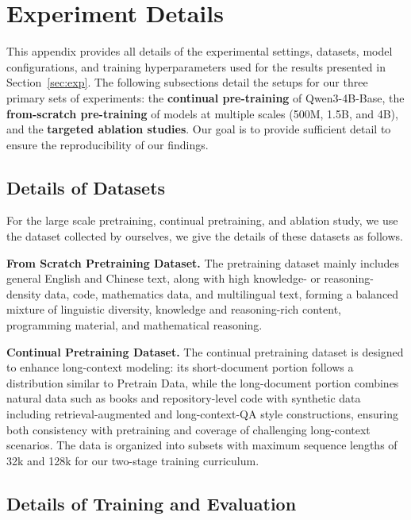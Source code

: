 \section{Experiment Details}
\label{app:exp}

This appendix provides all details of the experimental settings, datasets, model configurations, and training hyperparameters used for the results presented in Section~\ref{sec:exp}. The following subsections detail the setups for our three primary sets of experiments: the \textbf{continual pre-training} of Qwen3-4B-Base, the \textbf{from-scratch pre-training} of models at multiple scales (500M, 1.5B, and 4B), and the \textbf{targeted ablation studies}. Our goal is to provide sufficient detail to ensure the reproducibility of our findings.


\subsection{Details of Datasets}
\label{app:dataset}

For the large scale pretraining, continual pretraining, and ablation study, we use the dataset collected by ourselves, we give the details of these datasets as follows.

\textbf{From Scratch Pretraining Dataset.} The pretraining dataset mainly includes general English and Chinese text, along with high knowledge- or reasoning-density data, code, mathematics data, and multilingual text, forming a balanced mixture of linguistic diversity, knowledge and reasoning-rich content, programming material, and mathematical reasoning. 

\textbf{Continual Pretraining Dataset.} The continual pretraining dataset is designed to enhance long-context modeling: its short-document portion follows a distribution similar to Pretrain Data, while the long-document portion combines natural data such as books and repository-level code with synthetic data including retrieval-augmented and long-context-QA style constructions, ensuring both consistency with pretraining and coverage of challenging long-context scenarios. The data is organized into subsets with maximum sequence lengths of 32k and 128k for our two-stage training curriculum.


\subsection{Details of Training and Evaluation}
\label{app:train}

